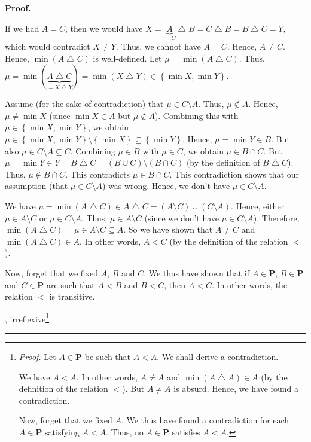 \documentclass[numbers=enddot,12pt,final,onecolumn,notitlepage]{scrartcl}%
\theoremstyle{definition}
\newenvironment{proof}[1][Proof]{\noindent\textbf{#1.} }{\ \rule{0.5em}{0.5em}}
\newenvironment{verlong}{}{}
\begin{document}
\begin{verlong}
\begin{proof}
{If we had $A=C$, then we would have $X=\underbrace{A}_{=C}\bigtriangleup
B=C\bigtriangleup B=B\bigtriangleup C=Y$, which would contradict $X\neq Y$.
Thus, we cannot have $A=C$. Hence, $A\neq C$. Hence, $\min\left(
A\bigtriangleup C\right)  $ is well-defined. Let $\mu=\min\left(
A\bigtriangleup C\right)  $. Thus, $\mu=\min\left(
\underbrace{A\bigtriangleup C}_{=X\bigtriangleup Y}\right)  =\min\left(
X\bigtriangleup Y\right)  \in\left\{  \min X,\min Y\right\}  $.
\par
Assume (for the sake of contradiction) that $\mu\in C\setminus A$. Thus,
$\mu\notin A$. Hence, $\mu\neq\min X$ (since $\min X\in A$ but $\mu\notin A$).
Combining this with $\mu\in\left\{  \min X,\min Y\right\}  $, we obtain
$\mu\in\left\{  \min X,\min Y\right\}  \setminus\left\{  \min X\right\}
\subseteq\left\{  \min Y\right\}  $. Hence, $\mu=\min Y\in B$. But also
$\mu\in C\setminus A\subseteq C$. Combining $\mu\in B$ with $\mu\in C$, we
obtain $\mu\in B\cap C$. But $\mu=\min Y\in Y=B\bigtriangleup C=\left(  B\cup
C\right)  \setminus\left(  B\cap C\right)  $ (by the definition of
$B\bigtriangleup C$). Thus, $\mu\notin B\cap C$. This contradicts $\mu\in
B\cap C$. This contradiction shows that our assumption (that $\mu\in
C\setminus A$) was wrong. Hence, we don't have $\mu\in C\setminus A$.
\par
We have $\mu=\min\left(  A\bigtriangleup C\right)  \in A\bigtriangleup
C=\left(  A\setminus C\right)  \cup\left(  C\setminus A\right)  $. Hence,
either $\mu\in A\setminus C$ or $\mu\in C\setminus A$. Thus, $\mu\in
A\setminus C$ (since we don't have $\mu\in C\setminus A$). Therefore,
$\min\left(  A\bigtriangleup C\right)  =\mu\in A\setminus C\subseteq A$. So we
have shown that $A\neq C$ and $\min\left(  A\bigtriangleup C\right)  \in A$.
In other words, $A<C$ (by the definition of the relation $<$).
\par
Now, forget that we fixed $A$, $B$ and $C$. We thus have shown that if
$A\in\mathbf{P}$, $B\in\mathbf{P}$ and $C\in\mathbf{P}$ are such that $A<B$
and $B<C$, then $A<C$. In other words, the relation $<$ is transitive.},
irreflexive\footnote{\textit{Proof.} Let $A\in\mathbf{P}$ be such that $A<A$.
We shall derive a contradiction.
\par
We have $A<A$. In other words, $A\neq A$ and $\min\left(  A\bigtriangleup
A\right)  \in A$ (by the definition of the relation $<$). But $A\neq A$ is
absurd. Hence, we have found a contradiction.
\par
Now, forget that we fixed $A$. We thus have found a contradiction for each
$A\in\mathbf{P}$ satisfying $A<A$. Thus, no $A\in\mathbf{P}$ satisfies $A<A$.
}
\end{proof}
\end{verlong}
\end{document}
